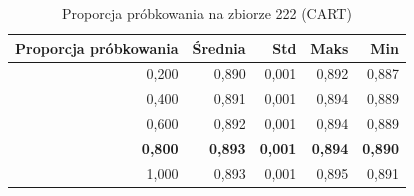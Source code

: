 \begin{table}[htbp]
\centering
\small
\setlength{\tabcolsep}{6pt}
\renewcommand{\arraystretch}{1.2}
\caption{Proporcja próbkowania na zbiorze 222 (CART)}
\label{tab:CART_sample_ratio_222}
\begin{tabular}{r|r|r|r|r}
\toprule
Proporcja próbkowania & Średnia & Std & Maks & Min \\
\hline
0,200 & 0,890 & 0,001 & 0,892 & 0,887 \\
0,400 & 0,891 & 0,001 & 0,894 & 0,889 \\
0,600 & 0,892 & 0,001 & 0,894 & 0,889 \\
\textbf{0,800} & \textbf{0,893} & \textbf{0,001} & \textbf{0,894} & \textbf{0,890} \\
1,000 & 0,893 & 0,001 & 0,895 & 0,891 \\
\bottomrule
\end{tabular}
\end{table}